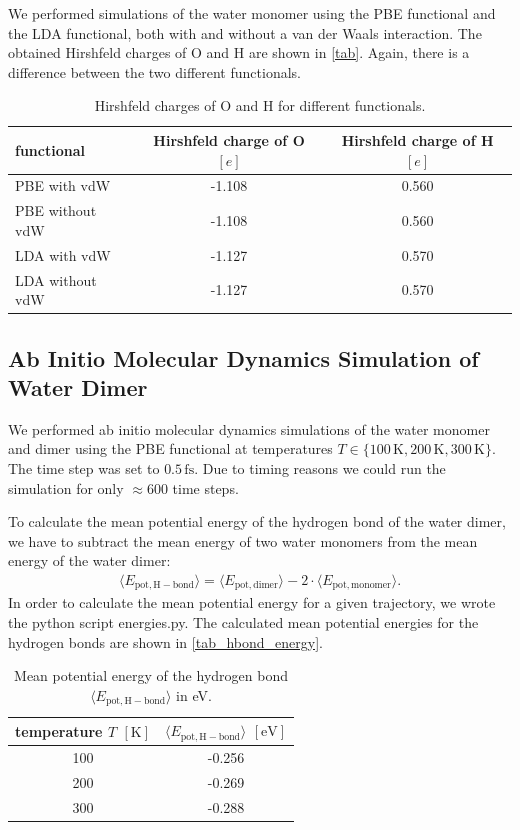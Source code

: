 \documentclass[a4paper,10pt,bibtotoc]{scrartcl}
\begin{document}
\noindent We performed simulations of the water monomer using the PBE functional and the LDA functional, both with and without a van der Waals interaction. 
The obtained Hirshfeld charges of O and H are shown in \autoref{tab}.
Again, there is a difference between the two different functionals.

\begin{table}[h]
\centering
\caption{Hirshfeld charges of O and H for different functionals.}
\begin{tabular}{@{}lcc@{}}
\toprule
functional & Hirshfeld charge of O $\left[e\right]$ & Hirshfeld charge of H $\left[e\right]$ \\ \midrule
PBE with vdW       & -1.108 & 0.560                 \\
PBE without vdW       & -1.108 & 0.560            \\
LDA with vdW       & -1.127 & 0.570              \\ 
LDA without vdW & -1.127 & 0.570\\\bottomrule
\end{tabular}
\label{tab}
\end{table}

\subsection{Ab Initio Molecular Dynamics Simulation of Water Dimer}
We performed ab initio molecular dynamics simulations of the water monomer and dimer using the PBE functional at temperatures $T\in\{100\,\mathrm{K}, 200\,\mathrm{K}, 300\,\mathrm{K}\}$. 
The time step was set to $0.5\,\mathrm{fs}$.
Due to timing reasons we could run the simulation for only $\approx 600$ time steps.

To calculate the mean potential energy of the hydrogen bond of the water dimer, we have to subtract the mean energy of two water monomers from the mean energy of the water dimer:
\begin{align}
\langle E_\mathrm{pot,H-bond}\rangle = \langle E_\mathrm{pot,dimer}\rangle - 2\cdot \langle E_\mathrm{pot,monomer}\rangle .
\end{align}
In order to calculate the mean potential energy for a given trajectory, we wrote the python script energies.py. 
The calculated mean potential energies for the hydrogen bonds are shown in \autoref{tab_hbond_energy}.

\begin{table}[h]
\centering
\caption{Mean potential energy of the hydrogen bond $\langle E_\mathrm{pot,H-bond}\rangle$ in eV.}
\begin{tabular}{@{}cc@{}}
\toprule
temperature $T$ $\left[\mathrm{K}\right]$ & $\langle E_\mathrm{pot,H-bond}\rangle$ $\left[\mathrm{eV}\right]$\\ \midrule
100         &   -0.256\\
200        &  -0.269\\
300      &     -0.288\\ \bottomrule
\end{tabular}
\label{tab_hbond_energy}
\end{table}
\end{document}
